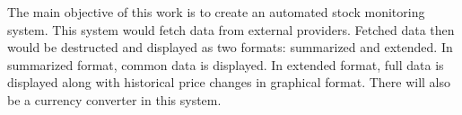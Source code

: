 The main objective of this work is to create an automated stock monitoring system. This system would fetch data from external providers. Fetched data then would be destructed and displayed as two formats: summarized and extended. In summarized format, common data is displayed. In extended format, full data is displayed along with historical price changes in graphical format. There will also be a currency converter in this system.